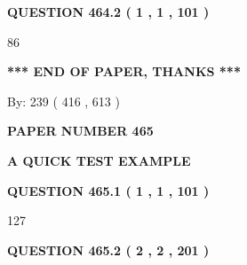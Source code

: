 \documentclass[12pt]{article}
\begin{document}
 
 
 
  
\vspace{0.2in}
  
{\textbf{\Large{QUESTION
464.2 
 ( 1 , 1 , 101 )
}}}
  
  
 
 
\noindent{}

86
 
 
   
   
 \vspace{0.2in}
 
   
   
   
   
\vspace{1.0in} 
{\textbf{\large{ *** END OF PAPER, THANKS *** }}} 
   
   
\hspace{1.0in} By: 
 239 ( 416 ,  613 )
   
   
   
   
\newpage 
\setcounter{page}{ 
   465001 } 
   
   
   
   
 {\textbf{ \Large{ PAPER NUMBER  465  }}}
   
   
\vspace{0.2in}
   
   
   
   
   
   
 \vspace{0.2in}
{\LARGE {\textbf{ A QUICK TEST EXAMPLE}}}
   
   
  
\vspace{0.2in}
  
{\textbf{\Large{QUESTION
465.1 
 ( 1 , 1 , 101 )
}}}
  
  
 
 
\noindent{}

127
 
 
  
\vspace{0.2in}
  
{\textbf{\Large{QUESTION
465.2 
 ( 2 , 2 , 201 )
}}}
  
  
 
 
\noindent{}
 
\end{document}
